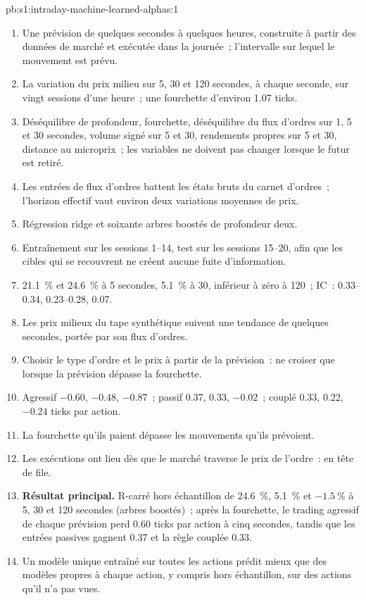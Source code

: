 \begin{solution}{pb:s1:intraday-machine-learned-alphas:1}
\begin{enumerate}
\item Une prévision de quelques secondes à quelques heures, construite à partir des données de marché et exécutée dans la journée~; l'intervalle sur lequel le mouvement est prévu.
\item La variation du prix milieu sur 5, 30 et 120 secondes, à chaque seconde, sur vingt sessions d'une heure~; une fourchette d'environ 1.07 ticks.
\item Déséquilibre de profondeur, fourchette, déséquilibre du flux d'ordres sur 1, 5 et 30 secondes, volume signé sur 5 et 30, rendements propres sur 5 et 30, distance au microprix~;
les variables ne doivent pas changer lorsque le futur est retiré.
\item Les entrées de flux d'ordres battent les états bruts du carnet d'ordres~; l'horizon effectif vaut environ deux variations moyennes de prix.
\item Régression ridge et soixante arbres boostés de profondeur deux.
\item Entraînement sur les sessions 1--14, test sur les sessions 15--20, afin que les cibles qui se recouvrent ne créent aucune fuite d'information.
\item 21.1~\% et 24.6~\% à 5 secondes, 5.1~\% à 30, inférieur à zéro à 120~; IC~: 0.33--0.34, 0.23--0.28, 0.07.
\item Les prix milieux du tape synthétique suivent une tendance de quelques secondes, portée par son flux d'ordres.
\item Choisir le type d'ordre et le prix à partir de la prévision~: ne croiser que lorsque la prévision dépasse la fourchette.
\item Agressif $-0.60$, $-0.48$, $-0.87$~; passif 0.37, 0.33, $-0.02$~; couplé 0.33, 0.22, $-0.24$ ticks par action.
\item La fourchette qu'ils paient dépasse les mouvements qu'ils prévoient.
\item Les exécutions ont lieu dès que le marché traverse le prix de l'ordre~: en tête de file.
\item \textbf{Résultat principal.} R-carré hors échantillon de 24.6~\%, 5.1~\% et $-1.5~\%$ à 5, 30 et 120 secondes (arbres boostés)~; après la fourchette, le trading agressif
de chaque prévision perd 0.60 ticks par action à cinq secondes, tandis que les entrées passives gagnent 0.37 et la règle couplée 0.33.
\item Un modèle unique entraîné sur toutes les actions prédit mieux que des modèles propres à chaque action, y compris hors échantillon, sur des actions qu'il n'a pas vues.

\end{enumerate}
\end{solution}

